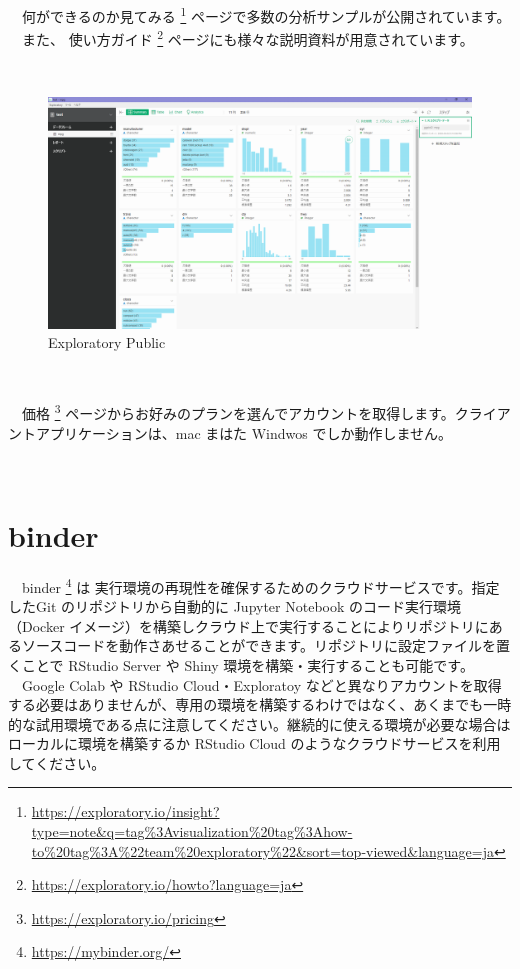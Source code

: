 \documentclass[
  12pt,
]{book}
\DeclareRobustCommand{\href}[2]{#2\footnote{\url{#1}}}
\begin{document}
　\href{https://exploratory.io/insight?type=note\&q=tag\%3Avisualization\%20tag\%3Ahow-to\%20tag\%3A\%22team\%20exploratory\%22\&sort=top-viewed\&language=ja}{何ができるのか見てみる } ページで多数の分析サンプルが公開されています。\\
　また、 \href{https://exploratory.io/howto?language=ja}{使い方ガイド } ページにも様々な説明資料が用意されています。

　\\

\begin{figure}[H]

{\centering \includegraphics[width=0.8\linewidth,]{fig/Exploratory} 

}

\caption{Exploratory Public}\label{fig:unnamed-chunk-148}
\end{figure}

　

　\href{https://exploratory.io/pricing}{価格 } ページからお好みのプランを選んでアカウントを取得します。クライアントアプリケーションは、mac まはた Windwos でしか動作しません。

　

\hypertarget{binder}{%
\section{binder}\label{binder}}

　\href{https://mybinder.org/}{binder } は 実行環境の再現性を確保するためのクラウドサービスです。指定したGit のリポジトリから自動的に Jupyter Notebook のコード実行環境（Docker イメージ）を構築しクラウド上で実行することによりリポジトリにあるソースコードを動作さあせることができます。リポジトリに設定ファイルを置くことで RStudio Server や Shiny 環境を構築・実行することも可能です。\\
　Google Colab や RStudio Cloud・Exploratoy などと異なりアカウントを取得する必要はありませんが、専用の環境を構築するわけではなく、あくまでも一時的な試用環境である点に注意してください。継続的に使える環境が必要な場合は ローカルに環境を構築するか RStudio Cloud のようなクラウドサービスを利用してください。
\end{document}
